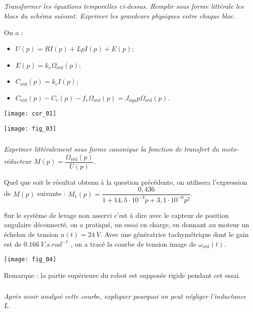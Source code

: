 \begin{multicols}{2}
\subparagraph{}\textit{Transformer les équations temporelles ci-dessus. 
Remplir sous forme littérale les blocs du schéma suivant. Exprimer les grandeurs physiques entre chaque bloc. }
\ifprof
\begin{corrige}
On a : 
\begin{itemize}
\item $U(p) = R I(p) + LpI(p)+ E(p)$;
\item $E(p) = k_e  \Omega_{\text{réd}}(p)$;
\item $C_{\text{réd}} (p)= k_c  I(p)$;
\item $C_{\text{réd}} (p) - C_r(p) - f_v \Omega_{\text{réd}}(p)= J_{\text{équ}}  p \Omega_{\text{réd}}(p)$. 
\end{itemize}
\end{corrige}
\begin{center}
\texttt{[image: cor\_01]}
\end{center}

\else
\fi

\begin{center}
\texttt{[image: fig\_03]}
\end{center}


\subparagraph{}\textit{Exprimer littéralement sous forme canonique la fonction de transfert du moto-réducteur $M(p)=\dfrac{\Omega_{\text{réd}}(p)}{U(p)}$.}
\ifprof
\begin{corrige}
\end{corrige}
\else
\fi

Quel que soit le résultat obtenu à la question précédente, on utilisera l’expression de $M(p)$ suivante : $M_1(p)=\dfrac{0,436}{1+14,5\cdot 10^{-3}p+3,1\cdot 10^{-6}p^2}$. 

Sur le système de levage non asservi c’est à dire avec le capteur de position angulaire déconnecté, on a pratiqué, un essai en charge, en donnant au moteur un échelon de tension $u(t) = \SI{24}{V}$. 
Avec une génératrice tachymétrique dont le gain est de $\SI{0,166}{V.s.rad^{-1}}$ , on a tracé la courbe de tension image de $\omega_{\text{réd}}(t)$.  

\begin{center}
\texttt{[image: fig\_04]}
\end{center}


Remarque : la partie supérieure du robot est supposée rigide pendant cet essai.


\subparagraph{}\textit{Après avoir analysé cette courbe, expliquer pourquoi on peut négliger l’inductance $L$.}
\ifprof
\begin{corrige}
\end{corrige}
\else
\fi



\end{multicols}
